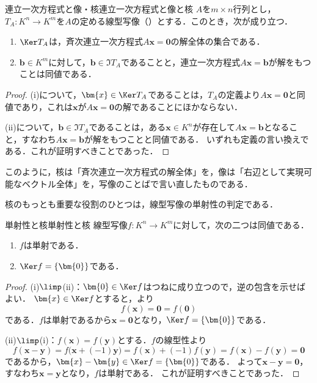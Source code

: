 \begin{prop}{連立一次方程式と像・核}{連立一次方程式と像と核}
  $A$を$m \times n$行列とし，$T_A \colon K^n \to K^m$を$A$の定める線型写像（）とする．このとき，次が成り立つ．
  \begin{enumerate}[label=(\roman*),leftmargin=3.2em]
    \item $\Ker T_A$は，斉次連立一次方程式$A\bm{x} = \bm{0}$の解全体の集合である．
    \item $\bm{b} \in K^m$に対して，$\bm{b} \in \Im T_A$であることと，連立一次方程式$A\bm{x} = \bm{b}$が解をもつことは同値である．
  \end{enumerate}
\end{prop}

\begin{tleftbar}
\begin{proof}
  (i)について，$\bm{x} \in \Ker T_A$であることは，$T_A$の定義より$A\bm{x} = \bm{0}$と同値であり，これは$\bm{x}$が$A\bm{x} = \bm{0}$の解であることにほかならない．

  (ii)について，$\bm{b} \in \Im T_A$であることは，ある$\bm{x} \in K^n$が存在して$A\bm{x} = \bm{b}$となること，すなわち$A\bm{x} = \bm{b}$が解をもつことと同値である．
  いずれも定義の言い換えである．これが証明すべきことであった．
\end{proof}
\end{tleftbar}

このように，核は「斉次連立一次方程式の解全体」を，像は「右辺として実現可能なベクトル全体」を，写像のことばで言い直したものである．

核のもっとも重要な役割のひとつは，線型写像の単射性の判定である．

\begin{prop}{単射性と核}{単射性と核}
  線型写像$f \colon K^n \to K^m$に対して，次の二つは同値である．
  \begin{enumerate}[label=(\roman*),leftmargin=3.2em]
    \item $f$は単射である．
    \item $\Ker f = \{\bm{0}\}$である．
  \end{enumerate}
\end{prop}

\begin{tleftbar}
\begin{proof}
  (i)$\limp$(ii)：$\bm{0} \in \Ker f$はつねに成り立つので，逆の包含を示せばよい．
  $\bm{x} \in \Ker f$とすると，より
  \[
    f(\bm{x}) = \bm{0} = f(\bm{0})
  \]
  である．$f$は単射であるから$\bm{x} = \bm{0}$となり，$\Ker f = \{\bm{0}\}$である．

  (ii)$\limp$(i)：$f(\bm{x}) = f(\bm{y})$とする．$f$の線型性より
  \[
    f(\bm{x} - \bm{y}) = f\bigl(\bm{x} + (-1)\bm{y}\bigr) = f(\bm{x}) + (-1)f(\bm{y}) = f(\bm{x}) - f(\bm{y}) = \bm{0}
  \]
  であるから，$\bm{x} - \bm{y} \in \Ker f = \{\bm{0}\}$である．
  よって$\bm{x} - \bm{y} = \bm{0}$，すなわち$\bm{x} = \bm{y}$となり，$f$は単射である．
  これが証明すべきことであった．
\end{proof}
\end{tleftbar}

